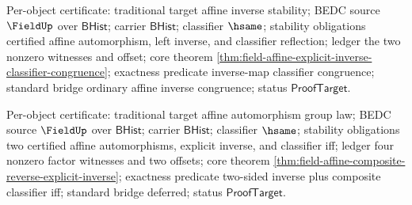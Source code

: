 Per-object certificate: traditional target affine inverse stability; BEDC source
$\FieldUp$ over $\mathsf{BHist}$; carrier $\mathsf{BHist}$; classifier
$\hsame$; stability obligations certified affine automorphism, left inverse,
and classifier reflection; ledger the two nonzero witnesses and offset; core
theorem
\autoref{thm:field-affine-explicit-inverse-classifier-congruence}; exactness
predicate inverse-map classifier congruence; standard bridge ordinary affine
inverse congruence; status $\mathsf{ProofTarget}$.

Per-object certificate: traditional target affine automorphism group law; BEDC
source $\FieldUp$ over $\mathsf{BHist}$; carrier $\mathsf{BHist}$; classifier
$\hsame$; stability obligations two certified affine automorphisms, explicit
inverse, and classifier iff; ledger four nonzero factor witnesses and two
offsets; core theorem
\autoref{thm:field-affine-composite-reverse-explicit-inverse}; exactness
predicate two-sided inverse plus composite classifier iff; standard bridge
deferred; status $\mathsf{ProofTarget}$.

